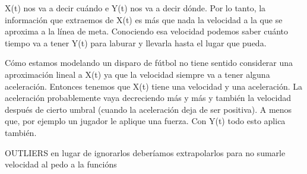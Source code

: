 X(t) nos va a decir cuándo e Y(t) nos va a decir dónde. Por lo tanto, la información que extraemos de X(t) es más que nada 
la velocidad a la que se aproxima a la línea de meta. Conociendo esa velocidad podemos saber cuánto tiempo va a tener Y(t) para laburar
y llevarla hasta el lugar que pueda. 

Cómo estamos modelando un disparo de fútbol no tiene sentido considerar una aproximación lineal a X(t) ya que la velocidad siempre va 
a tener alguna aceleración. Entonces tenemos que X(t) tiene una velocidad y una aceleración. La aceleración probablemente vaya decreciendo
más y más y también la velocidad después de cierto umbral (cuando la aceleración deja de ser positiva). A menos que, por ejemplo un 
jugador le aplique una fuerza. Con Y(t) todo esto aplica también.


OUTLIERS
en lugar de ignorarlos deberíamos extrapolarlos para no sumarle velocidad al pedo a la funcións